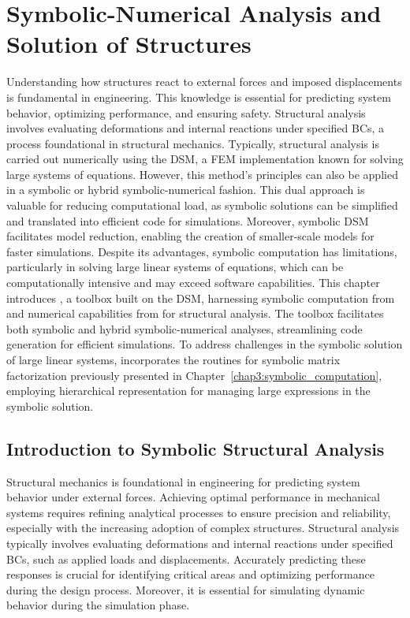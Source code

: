 
\chapter[Symbolic Solution of Structures]{Symbolic-Numerical Analysis and Solution of Structures}
\label{app4:trussme}

Understanding how structures react to external forces and imposed displacements is fundamental in engineering. This knowledge is essential for predicting system behavior, optimizing performance, and ensuring safety. Structural analysis involves evaluating deformations and internal reactions under specified \acp{BC}, a process foundational in structural mechanics. Typically, structural analysis is carried out numerically using the \ac{DSM}, a \ac{FEM} implementation known for solving large systems of equations. However, this method's principles can also be applied in a symbolic or hybrid symbolic-numerical fashion. This dual approach is valuable for reducing computational load, as symbolic solutions can be simplified and translated into efficient code for simulations. Moreover, symbolic \ac{DSM} facilitates model reduction, enabling the creation of smaller-scale models for faster simulations. Despite its advantages, symbolic computation has limitations, particularly in solving large linear systems of equations, which can be computationally intensive and may exceed software capabilities. This chapter introduces \TrussMe{}, a toolbox built on the \ac{DSM}, harnessing symbolic computation from \Maple{} and numerical capabilities from \Matlab{} for structural analysis. The toolbox facilitates both symbolic and hybrid symbolic-numerical analyses, streamlining code generation for efficient simulations. To address challenges in the symbolic solution of large linear systems, \TrussMe{} incorporates the routines for symbolic matrix factorization previously presented in Chapter~\ref{chap3:symbolic_computation}, employing hierarchical representation for managing large expressions in the symbolic solution.


\section{Introduction to Symbolic Structural Analysis}
\label{app4:sec:introduction}

Structural mechanics is foundational in engineering for predicting system behavior under external forces. Achieving optimal performance in mechanical systems requires refining analytical processes to ensure precision and reliability, especially with the increasing adoption of complex structures. Structural analysis typically involves evaluating deformations and internal reactions under specified \acp{BC}, such as applied loads and displacements. Accurately predicting these responses is crucial for identifying critical areas and optimizing performance during the design process. Moreover, it is essential for simulating dynamic behavior during the simulation phase.

